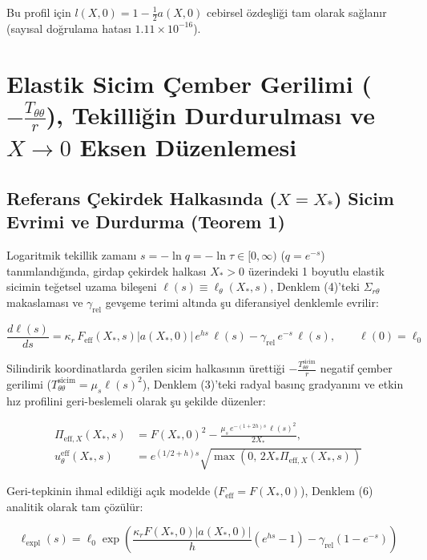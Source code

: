 \documentclass[12pt,a4paper]{article}
\begin{document}
Bu profil için $l(X, 0) = 1 - \frac{1}{2}a(X, 0)$ cebirsel özdeşliği tam olarak sağlanır (sayısal doğrulama hatası $1.11 \times 10^{-16}$).

\section{Elastik Sicim Çember Gerilimi ($-\frac{T_{\theta\theta}}{r}$), Tekilliğin Durdurulması ve $X \to 0$ Eksen Düzenlemesi}

\subsection{Referans Çekirdek Halkasında ($X = X_*$) Sicim Evrimi ve Durdurma (Teorem 1)}

Logaritmik tekillik zamanı $s = -\ln q = -\ln \tau \in [0, \infty)$ ($q = e^{-s}$) tanımlandığında, girdap çekirdek halkası $X_* > 0$ üzerindeki 1 boyutlu elastik sicimin teğetsel uzama bileşeni $\ell(s) \equiv \ell_\theta(X_*, s)$, Denklem (4)'teki $\Sigma_{r\theta}$ makaslaması ve $\gamma_{\mathrm{rel}}$ gevşeme terimi altında şu diferansiyel denklemle evrilir:

\begin{equation}
\frac{d \ell(s)}{ds} = \kappa_r \, F_{\mathrm{eff}}(X_*, s) |a(X_*, 0)| \, e^{h s} \, \ell(s) - \gamma_{\mathrm{rel}} \, e^{-s} \, \ell(s), \qquad \ell(0) = \ell_0
\end{equation}

Silindirik koordinatlarda gerilen sicim halkasının ürettiği $-\frac{T_{\theta\theta}^{\mathrm{sicim}}}{r}$ negatif çember gerilimi ($T_{\theta\theta}^{\mathrm{sicim}} = \mu_s \ell(s)^2$), Denklem (3)'teki radyal basınç gradyanını ve etkin hız profilini geri-beslemeli olarak şu şekilde düzenler:

\begin{equation}
\begin{split}
\Pi_{\mathrm{eff}, X}(X_*, s) &= F(X_*, 0)^2 - \frac{\mu_s \, e^{-(1+2h)s} \, \ell(s)^2}{2 X_*}, \\
u_\theta^{\mathrm{eff}}(X_*, s) &= e^{(1/2 + h)s} \sqrt{\max\left( 0, \, 2 X_* \Pi_{\mathrm{eff}, X}(X_*, s) \right)}
\end{split}
\end{equation}

Geri-tepkinin ihmal edildiği açık modelde ($F_{\mathrm{eff}} = F(X_*, 0)$), Denklem (6) analitik olarak tam çözülür:

\begin{equation}
\ell_{\mathrm{expl}}(s) = \ell_0 \exp\left( \frac{\kappa_r F(X_*, 0) |a(X_*, 0)|}{h} \left( e^{h s} - 1 \right) - \gamma_{\mathrm{rel}} \left( 1 - e^{-s} \right) \right)
\end{equation}
\end{document}
